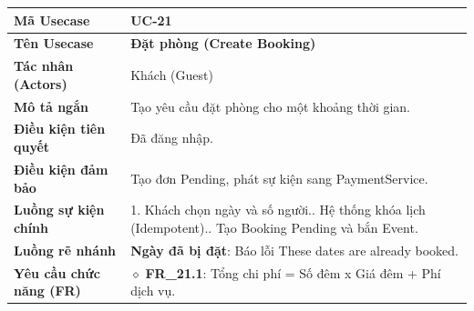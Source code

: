 \begin{table}[H]
\renewcommand{\arraystretch}{1.3}
\centering
\begin{tabularx}{\textwidth}{|p{4.5cm}|X|}
\hline
\cellcolor{gray!15}\bfseries Mã Usecase & \textbf{UC-21} \\ \hline
\cellcolor{gray!15}\bfseries Tên Usecase & \textbf{Đặt phòng (Create Booking)} \\ \hline
\cellcolor{gray!15}\bfseries Tác nhân (Actors) & Khách (Guest) \\ \hline
\cellcolor{gray!15}\bfseries Mô tả ngắn & Tạo yêu cầu đặt phòng cho một khoảng thời gian. \\ \hline
\cellcolor{gray!15}\bfseries Điều kiện tiên quyết & Đã đăng nhập. \\ \hline
\cellcolor{gray!15}\bfseries Điều kiện đảm bảo & Tạo đơn Pending, phát sự kiện sang PaymentService. \\ \hline
\cellcolor{gray!15}\bfseries Luồng sự kiện chính & 1. Khách chọn ngày và số người.\newline 2. Hệ thống khóa lịch (Idempotent).\newline 3. Tạo Booking Pending và bắn Event. \\ \hline
\cellcolor{gray!15}\bfseries Luồng rẽ nhánh & \textbf{Ngày đã bị đặt}: Báo lỗi These dates are already booked. \\ \hline
\cellcolor{gray!15}\bfseries Yêu cầu chức năng (FR) & $\diamond$ \textbf{FR\_21.1}: Tổng chi phí = Số đêm x Giá đêm + Phí dịch vụ. \\ \hline
\end{tabularx}
\end{table}

